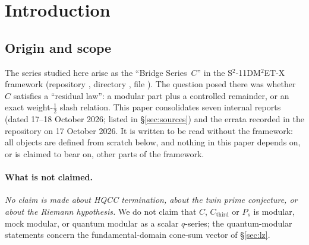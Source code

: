 \documentclass[11pt]{article}
\theoremstyle{definition}
\newcommand{\Cthird}{C_{\mathrm{third}}}
\begin{document}
\begin{abstract}
with the two matched local-parity sectors. It also adds exact dimensions of the function span, its Eisenstein part and its cusp part for
$s=5,\dots,51$ and $s=72$, closed forms in $s$ for the radial coefficients of $H_s$ through $t^{5/2}$, and a single-kernel, two-chain
construction of both parts of $\Cthird$. For the scalar row we prove (given three
earlier inputs) an exact twisted Herglotz/digamma closed form for the cocycle and a closed
Gauss-sum formula for the dual cone sum $E_R$. The cusp rows at rationals are shown numerically to
be finite combinations of Hecke $L$-values at $s=0$. Every statement is labelled Category A (proved, or exact,
including exact finite computation) or Category B (floating-point or PSLQ evidence only, identification by citation only,
interpretation, or conjecture); revision~4 applies this convention uniformly. No claim is made concerning HQCC termination, the twin prime conjecture, or the Riemann
hypothesis.
\end{abstract}

\tableofcontents

\section{Introduction}

\subsection{Origin and scope}
The series studied here arise as the ``Bridge Series~$C$'' in the S$^2$-11DM$^2$ET-X framework
(repository , directory
, file ).
The question posed there was whether $C$ satisfies a ``residual law'': a modular part plus a controlled
remainder, or an exact weight-$\tfrac12$ slash relation. This paper consolidates seven internal reports
(dated 17--18 October 2026; listed in \S\ref{sec:sources}) and the errata recorded in the repository on
17 October 2026. It is written to be read without the framework: all objects are defined from scratch
below, and nothing in this paper depends on, or is claimed to bear on, other parts of the framework.

\paragraph{What is not claimed.} \emph{No claim is made about HQCC termination, about the twin prime
conjecture, or about the Riemann hypothesis.} We do not claim that $C$, $\Cthird$ or $P_s$ is modular,
mock modular, or quantum modular as a scalar $q$-series; the quantum-modular statements concern the
fundamental-domain cone-sum vector of \S\ref{sec:lz}.
\end{document}
